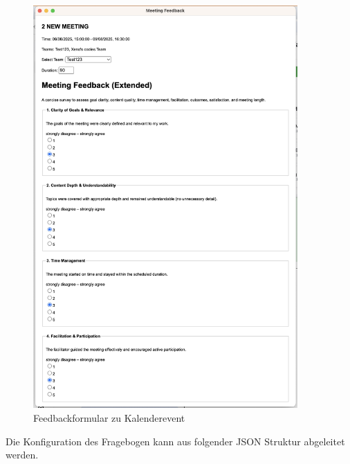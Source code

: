 \documentclass[12pt,a4paper]{report}
\begin{document}
        \begin{figure}[!htbp]
          \centering
          \includegraphics[width=0.90\textwidth]{../figures/yappi-chrome-extension/yappi-extension-feedback.jpg}
          \caption{Feedbackformular zu Kalenderevent}
          \label{fig:yappi-extension-feedback}
        \end{figure}

        Die Konfiguration des Fragebogen kann aus folgender JSON Struktur abgeleitet werden.
\end{document}
